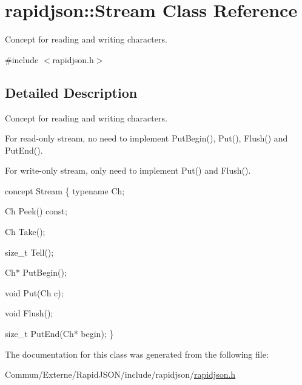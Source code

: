 \hypertarget{classrapidjson_1_1_stream}{}\section{rapidjson\+:\+:Stream Class Reference}
\label{classrapidjson_1_1_stream}


Concept for reading and writing characters.  




{\ttfamily \#include $<$rapidjson.\+h$>$}



\subsection{Detailed Description}
Concept for reading and writing characters. 

For read-\/only stream, no need to implement Put\+Begin(), Put(), Flush() and Put\+End().

For write-\/only stream, only need to implement Put() and Flush().


\begin{DoxyCode}
concept Stream \{
    \textcolor{keyword}{typename} Ch;    

    Ch Peek() \textcolor{keyword}{const};

    Ch Take();

    \textcolor{keywordtype}{size\_t} Tell();

    Ch* PutBegin();

    \textcolor{keywordtype}{void} Put(Ch c);

    \textcolor{keywordtype}{void} Flush();

    \textcolor{keywordtype}{size\_t} PutEnd(Ch* begin);
\}
\end{DoxyCode}
 

The documentation for this class was generated from the following file\+:\begin{DoxyCompactItemize}
\item 
Commun/\+Externe/\+Rapid\+J\+S\+O\+N/include/rapidjson/\hyperlink{rapidjson_8h}{rapidjson.\+h}\end{DoxyCompactItemize}

